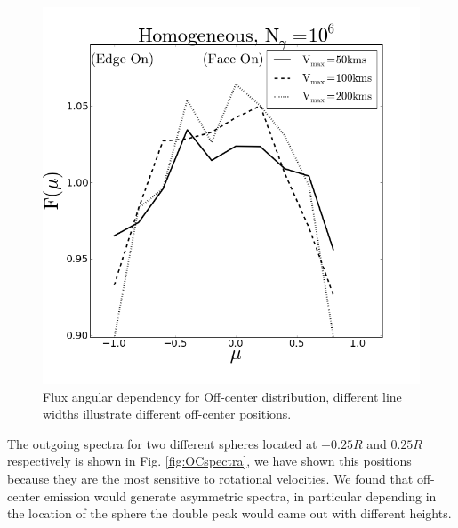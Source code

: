 \documentclass[usenatbib]{mn2e}
\begin{document}
\begin{figure}
\includegraphics[scale=0.3]{mu_OC.png}
\caption{Flux angular dependency for Off-center distribution, different line widths illustrate different
off-center positions.
   \label{fig:OCflux}} 
\end{figure}

The outgoing spectra for two different spheres located at $-0.25R$ and $0.25R$ respectively
is shown in Fig. \ref{fig:OCspectra}, we have shown this positions because
they are the most sensitive to rotational velocities. We found that off-center emission 
would generate asymmetric spectra, in particular depending in the location of the 
sphere the double peak would came out with different heights. 
\end{document}

